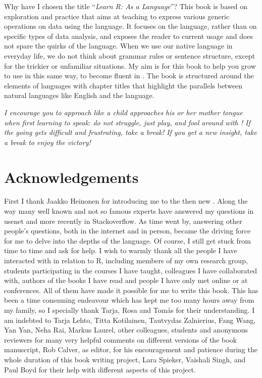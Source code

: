 Why have I chosen the title ``\emph{Learn R: As a Language}''? This book is based on exploration and practice that aims at teaching to express various generic operations on data using the \Rlang language. It focuses on the language, rather than on specific types of data analysis, and exposes the reader to current usage and does not spare the quirks of the language. When we use our native language in everyday life, we do not think about grammar rules or sentence structure, except for the trickier or unfamiliar situations. My aim is for this book to help you grow to use \Rlang in this same way, to become fluent in \Rlang. The book is structured around the elements of languages with chapter titles that highlight the parallels between natural languages like English and the \Rlang language.

\emph{I encourage you to approach \Rlang like a child approaches his or her mother tongue when first learning to speak: do not struggle, just play, and fool around with \Rlang! If the going gets difficult and frustrating, take a break! If you get a new insight, take a break to enjoy the victory!
}%

\section*{Acknowledgements}
First I  thank Jaakko Heinonen for introducing me to the then new \Rlang. Along the way many well known and not so famous experts have answered my questions in usenet and more recently in Stackoverflow. As time went by, answering other people's questions, both in the internet and in person, became the driving force for me to delve into the depths of the \Rlang language. Of course, I still get stuck from time to time and ask for help. I wish to warmly thank all the people I have interacted with in relation to R, including members of my own research group, students participating in the courses I have taught, colleagues I have collaborated with, authors of the books I have read and people I have only met online or at conferences. All of them have made it possible for me to write this book. This has been a time consuming endeavour which has kept me too many hours away from my family, so I specially thank Tarja, Rosa and Tomás for their understanding. I am indebted to Tarja Lehto, Titta Kotilainen, Tautvydas Zalnierius, Fang Wang, Yan Yan, Neha Rai, Markus Laurel, other colleagues, students and anonymous reviewers for many very helpful comments on different versions of the book manuscript, Rob Calver, as editor, for his encouragement and patience during the whole duration of this book writing project, Lara Spieker, Vaishali Singh, and Paul Boyd for their help with different aspects of this project.

